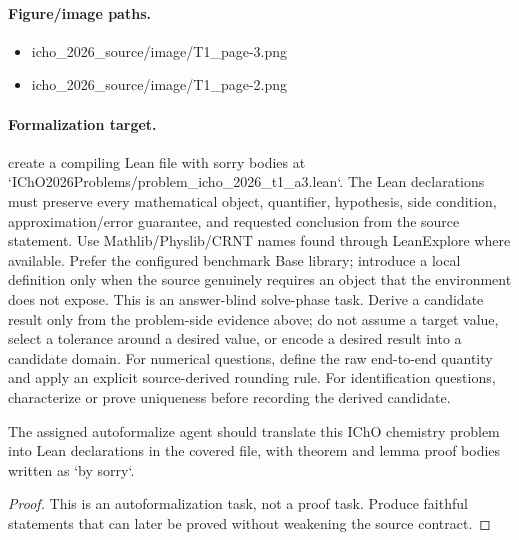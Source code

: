 \paragraph{Figure/image paths.}
\begin{itemize}
\item icho\_2026\_source/image/T1\_page-3.png
\item icho\_2026\_source/image/T1\_page-2.png
\end{itemize}

\paragraph{Formalization target.}
create a compiling Lean file with sorry bodies at `IChO2026Problems/problem\_icho\_2026\_t1\_a3.lean`.
The Lean declarations must preserve every mathematical object, quantifier, hypothesis, side condition, approximation/error guarantee, and requested conclusion from the source statement.
Use Mathlib/Physlib/CRNT names found through LeanExplore where available. Prefer the configured benchmark Base library; introduce a local definition only when the source genuinely requires an object that the environment does not expose.
This is an answer-blind solve-phase task. Derive a candidate result only from the problem-side evidence above; do not assume a target value, select a tolerance around a desired value, or encode a desired result into a candidate domain.
For numerical questions, define the raw end-to-end quantity and apply an explicit source-derived rounding rule. For identification questions, characterize or prove uniqueness before recording the derived candidate.

\begin{theorem}
\label{thm:physics:icho_2026_t1_a3:target}
The assigned autoformalize agent should translate this IChO chemistry problem into Lean declarations in the covered file, with theorem and lemma proof bodies written as `by sorry`.
\end{theorem}
\begin{proof}
This is an autoformalization task, not a proof task. Produce faithful statements that can later be proved without weakening the source contract.
\end{proof}
